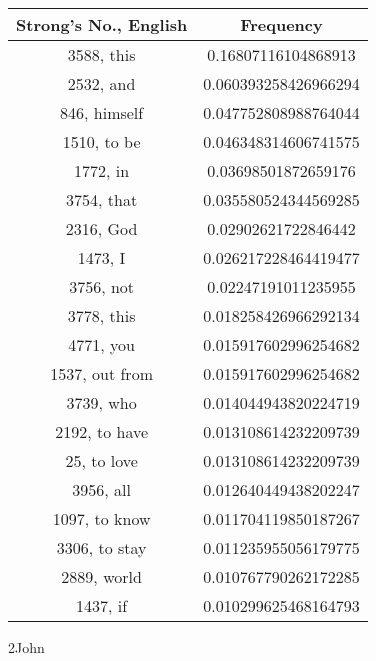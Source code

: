 \documentclass[12pt,letterpaper]{article}
\begin{document}
 \begin{longtable}{|c|c|}
\hline
 Strong's No., English & Frequency \\ \hline  
3588, this & 0.16807116104868913\\ \hline 
 2532, and & 0.060393258426966294\\ \hline 
 846, himself & 0.047752808988764044\\ \hline 
 1510, to be & 0.046348314606741575\\ \hline 
 1772, in & 0.03698501872659176\\ \hline 
 3754, that & 0.035580524344569285\\ \hline 
 2316, God & 0.02902621722846442\\ \hline 
 1473, I & 0.026217228464419477\\ \hline 
 3756, not & 0.02247191011235955\\ \hline 
 3778, this & 0.018258426966292134\\ \hline 
 4771, you & 0.015917602996254682\\ \hline 
 1537, out from & 0.015917602996254682\\ \hline 
 3739, who & 0.014044943820224719\\ \hline 
 2192, to have & 0.013108614232209739\\ \hline 
 25, to love & 0.013108614232209739\\ \hline 
 3956, all & 0.012640449438202247\\ \hline 
 1097, to know & 0.011704119850187267\\ \hline 
 3306, to stay & 0.011235955056179775\\ \hline 
 2889, world & 0.010767790262172285\\ \hline 
 1437, if & 0.010299625468164793\\ \hline 
\end{longtable} 
 

2John
\end{document}
